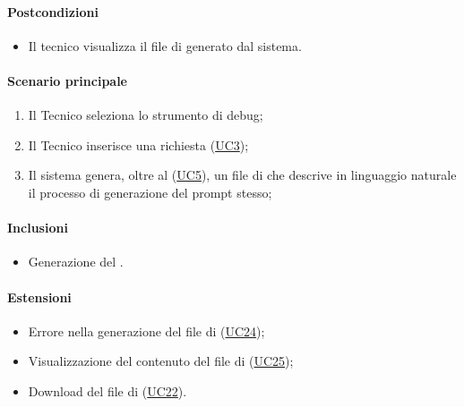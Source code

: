 \paragraph*{Postcondizioni}
\begin{itemize}
  \item Il tecnico visualizza il file di  generato dal sistema.
\end{itemize}

\paragraph*{Scenario principale}
\begin{enumerate}
  \item Il Tecnico seleziona lo strumento di debug;
  \item Il Tecnico inserisce una richiesta (\hyperref[UC3]{UC3});
  \item Il sistema genera, oltre al  (\hyperref[UC5]{UC5}), un file di  che descrive in linguaggio naturale il processo di generazione del prompt stesso; 
\end{enumerate}

\paragraph*{Inclusioni}
\begin{itemize}
  \item Generazione del .
\end{itemize}

\paragraph*{Estensioni}
\begin{itemize}
  \item Errore nella generazione del file di  (\hyperref[UC24]{UC24});
  \item Visualizzazione del contenuto del file di  (\hyperref[UC25]{UC25});
  \item Download del file di  (\hyperref[UC22]{UC22}).
\end{itemize}